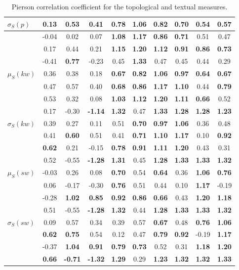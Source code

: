 \begin{table*}[h!]
\begin{center}
\begin{tabular}{| l || c | c | c | c | c | c | c | c | c |}
$\sigma_S(p)$ & 0.13 & 0.53 & 0.41 & {\bf 0.78} & {\bf 1.06} & {\bf 0.82} & {\bf 0.70} & 0.54 & 0.57 \\\hline
 & -0.04 & 0.02 & 0.07 & {\bf 1.08} & {\bf 1.17} & {\bf 0.86} & {\bf 0.71} & 0.51 & 0.47 \\\hline
 & 0.17 & 0.44 & 0.21 & {\bf 1.15} & {\bf 1.20} & {\bf 1.12} & {\bf 0.91} & {\bf 0.86} & {\bf 0.73} \\\hline
 & -0.41 & {\bf 0.77} & -0.23 & 0.45 & {\bf 1.33} & 0.47 & 0.45 & 0.44 & 0.29 \\\hline
$\mu_S(kw)$ & 0.36 & 0.38 & 0.18 & {\bf 0.67} & {\bf 0.82} & {\bf 1.06} & {\bf 0.97} & {\bf 0.64} & {\bf 0.67} \\\hline
 & 0.47 & 0.57 & 0.40 & {\bf 0.68} & {\bf 0.86} & {\bf 1.17} & {\bf 1.10} & 0.44 & {\bf 0.79} \\\hline
 & 0.53 & 0.32 & 0.08 & {\bf 1.03} & {\bf 1.12} & {\bf 1.20} & {\bf 1.11} & {\bf 0.66} & 0.52 \\\hline
 & 0.17 & -0.30 & {\bf -1.14} & {\bf 1.32} & 0.47 & {\bf 1.33} & {\bf 1.28} & {\bf 1.28} & {\bf 1.23} \\\hline
$\sigma_S(kw)$ & 0.39 & 0.27 & 0.11 & 0.51 & {\bf 0.70} & {\bf 0.97} & {\bf 1.06} & 0.36 & 0.48 \\\hline
 & 0.41 & {\bf 0.60} & 0.51 & 0.41 & {\bf 0.71} & {\bf 1.10} & {\bf 1.17} & 0.10 & {\bf 0.92} \\\hline
 & {\bf 0.62} & 0.21 & -0.15 & {\bf 0.78} & {\bf 0.91} & {\bf 1.11} & {\bf 1.20} & 0.43 & 0.31 \\\hline
 & 0.52 & -0.55 & {\bf -1.28} & {\bf 1.31} & 0.45 & {\bf 1.28} & {\bf 1.33} & {\bf 1.33} & {\bf 1.32} \\\hline
$\mu_S(sw)$ & -0.03 & 0.26 & 0.08 & {\bf 0.70} & 0.54 & {\bf 0.64} & 0.36 & {\bf 1.06} & {\bf 0.76} \\\hline
 & 0.06 & -0.17 & -0.30 & {\bf 0.76} & 0.51 & 0.44 & 0.10 & {\bf 1.17} & -0.19 \\\hline
 & -0.28 & {\bf 1.02} & {\bf 0.85} & {\bf 0.92} & {\bf 0.86} & {\bf 0.66} & 0.43 & {\bf 1.20} & {\bf 1.18} \\\hline
 & 0.51 & -0.55 & {\bf -1.28} & {\bf 1.32} & 0.44 & {\bf 1.28} & {\bf 1.33} & {\bf 1.33} & {\bf 1.32} \\\hline
$\sigma_S(sw)$ & 0.09 & 0.57 & 0.34 & 0.39 & 0.57 & {\bf 0.67} & 0.48 & {\bf 0.76} & {\bf 1.06} \\\hline
 & {\bf 0.62} & {\bf 0.75} & 0.54 & 0.12 & 0.47 & {\bf 0.79} & {\bf 0.92} & -0.19 & {\bf 1.17} \\\hline
 & -0.37 & {\bf 1.04} & {\bf 0.91} & {\bf 0.79} & {\bf 0.73} & 0.52 & 0.31 & {\bf 1.18} & {\bf 1.20} \\\hline
 & {\bf 0.66} & {\bf -0.71} & {\bf -1.32} & {\bf 1.29} & 0.29 & {\bf 1.23} & {\bf 1.32} & {\bf 1.32} & {\bf 1.33} \\\hline
\end{tabular}
\caption{Pierson correlation coefficient for the topological and textual measures.}
\end{center}
\end{table*}
